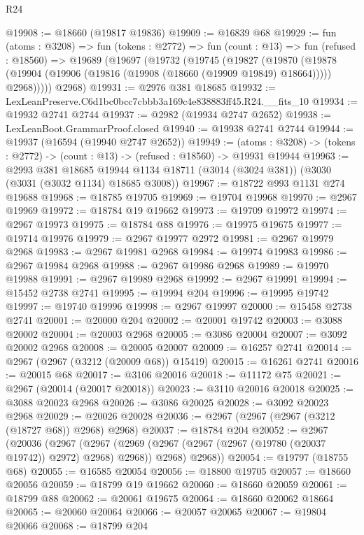 \begin{lexlean}{R24}
\begin{coremodule}
@19908 := @18660 (@19817 @19836)
@19909 := @16839 @68
@19929 := fun (atoms : @3208) =>
  fun (tokens : @2772) =>
  fun (count : @13) =>
  fun (refused : @18560) =>
  @19689
    (@19697
      (@19732
        (@19745
          (@19827
            (@19870
              (@19878 (@19904 (@19906 (@19816 (@19908 (@18660 (@19909 @19849) @18664))))) @2968)))))
      @2968)
@19931 := @2976 @381 @18685
@19932 := LexLeanPreserve.C6d1bc0bcc7cbbb3a169c4e838883ff45.R24.__fits_10
@19934 := @19932 @2741 @2744
@19937 := @2982 (@19934 @2747 @2652)
@19938 := LexLeanBoot.GrammarProof.closed
@19940 := @19938 @2741 @2744
@19944 := @19937 (@16594 (@19940 @2747 @2652))
@19949 := (atoms : @3208) ->
  (tokens : @2772) -> (count : @13) -> (refused : @18560) -> @19931 @19944
@19963 := @2993
    @381
    @18685
    @19944
    @1134
    @18711
    (@3014 (@3024 @381))
    (@3030 (@3031 (@3032 @1134) @18685 @3008))
@19967 := @18722 @993 @1131 @274 @19688
@19968 := @18785 @19705
@19969 := @19704 @19968
@19970 := @2967 @19969
@19972 := @18784 @19 @19662
@19973 := @19709 @19972
@19974 := @2967 @19973
@19975 := @18784 @88
@19976 := @19975 @19675
@19977 := @19714 @19976
@19979 := @2967 @19977 @2972
@19981 := @2967 @19979 @2968
@19983 := @2967 @19981 @2968
@19984 := @19974 @19983
@19986 := @2967 @19984 @2968
@19988 := @2967 @19986 @2968
@19989 := @19970 @19988
@19991 := @2967 @19989 @2968
@19992 := @2967 @19991
@19994 := @15452 @2738 @2741
@19995 := @19994 @204
@19996 := @19995 @19742
@19997 := @19740 @19996
@19998 := @2967 @19997
@20000 := @15458 @2738 @2741
@20001 := @20000 @204
@20002 := @20001 @19742
@20003 := @3088 @20002
@20004 := @20003 @2968
@20005 := @3086 @20004
@20007 := @3092 @20002 @2968
@20008 := @20005 @20007
@20009 := @16257 @2741
@20014 := @2967 (@2967 (@3212 (@20009 @68)) @15419)
@20015 := @16261 @2741
@20016 := @20015 @68
@20017 := @3106 @20016
@20018 := @11172 @75
@20021 := @2967 (@20014 (@20017 @20018))
@20023 := @3110 @20016 @20018
@20025 := @3088 @20023 @2968
@20026 := @3086 @20025
@20028 := @3092 @20023 @2968
@20029 := @20026 @20028
@20036 := @2967 (@2967 (@2967 (@3212 (@18727 @68)) @2968) @2968)
@20037 := @18784 @204
@20052 := @2967
    (@20036
      (@2967
        (@2967 (@2969 (@2967 (@2967 (@2967 (@19780 (@20037 @19742)) @2972) @2968) @2968)) @2968)
        @2968))
@20054 := @19797 (@18755 @68)
@20055 := @16585 @20054
@20056 := @18800 @19705
@20057 := @18660 @20056
@20059 := @18799 @19 @19662
@20060 := @18660 @20059
@20061 := @18799 @88
@20062 := @20061 @19675
@20064 := @18660 @20062 @18664
@20065 := @20060 @20064
@20066 := @20057 @20065
@20067 := @19804 @20066
@20068 := @18799 @204

\end{coremodule}
\end{lexlean}
